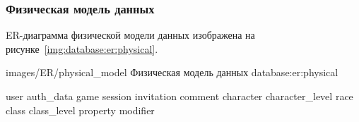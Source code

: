 \subsubsection{Физическая модель данных}

ER-диаграмма физической модели данных изображена на рисунке~\ref{img:database:er:physical}.

            {images/ER/physical_model}
            {Физическая модель данных}
            {database:er:physical}

{user}
{auth_data}
{game}
{session}
{invitation}
{comment}
{character}
{character_level}
{race}
{class}
{class_level}
{property}
{modifier}

\emptyString
